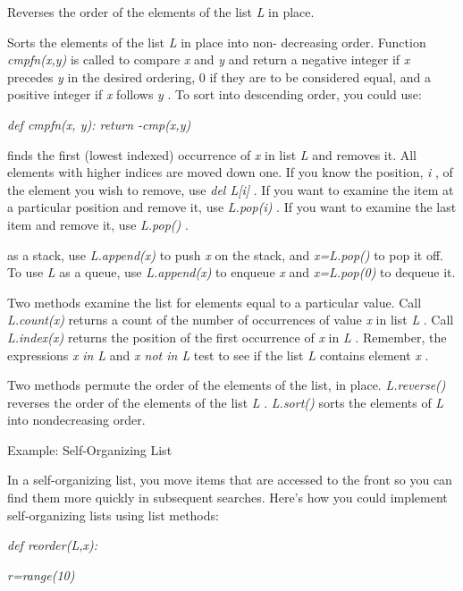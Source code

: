 Reverses the order of the elements
of the list \emph{L} in place.





Sorts the elements of the list
\emph{L} in place into non- decreasing order. Function \emph{cmpfn(x,y)}
is called to compare \emph{x} and \emph{y} and return a negative integer
if \emph{x} precedes \emph{y} in the desired ordering, 0 if they are to
be considered equal, and a positive integer if \emph{x} follows \emph{y}
. To sort into descending order, you could use:

 \emph{def cmpfn(x, y): return
-cmp(x,y)}


finds the first (lowest indexed) occurrence of \emph{x} in list \emph{L}
and removes it. All elements with higher indices are moved down one. If
you know the position, \emph{i} , of the element you wish to remove, use
\emph{del L{[}i{]}} . If you want to examine the item at a particular
position and remove it, use \emph{L.pop(i)} . If you want to examine the
last item and remove it, use \emph{L.pop()} .

 as a stack, use
\emph{L.append(x)} to push \emph{x} on the stack, and \emph{x=L.pop()}
to pop it off. To use \emph{L} as a queue, use \emph{L.append(x)} to
enqueue \emph{x} and \emph{x=L.pop(0)} to dequeue it.

Two methods examine the list for
elements equal to a particular value. Call \emph{L.count(x)} returns a
count of the number of occurrences of value \emph{x} in list \emph{L} .
Call \emph{L.index(x)} returns the position of the first occurrence of
\emph{x} in \emph{L} . Remember, the expressions \emph{x} \emph{in L}
and \emph{x not in L} test to see if the list \emph{L} contains element
\emph{x} .

Two methods permute the order of
the elements of the list, in place. \emph{L.reverse()} reverses the
order of the elements of the list \emph{L} . \emph{L.sort()} sorts the
elements of \emph{L} into nondecreasing order.

Example: Self-Organizing List

In a self-organizing list, you move
items that are accessed to the front so you can find them more quickly
in subsequent searches. Here's how you could implement self-organizing
lists using list methods:


\emph{def reorder(L,x):}








\emph{r=range(10)}


